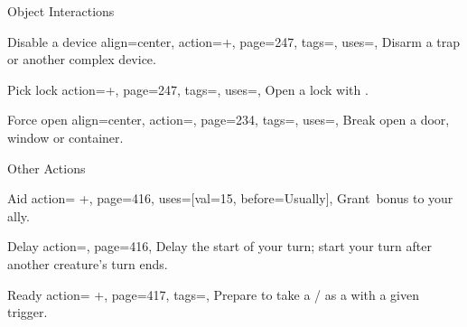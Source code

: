 \begin{PageBack}
\begin{Tables}{\backTableHeight}
\begin{Table}{Object Interactions}
\begin{entry}{Disable a device}{%
                align=center,
                action=+,
                page=247,
                tags=\Manipulate,
                uses={\Thievery[tags={T}]},
            }
                Disarm a trap or another complex device. \hfill {}\\
                \hfill
            \end{entry}
            \begin{entry}{Pick lock}{%
                action=+,
                page=247,
                tags=\Manipulate,
                uses={\Thievery[tags={T}]},
            }
                Open a lock with . \hfill{}\;
            \end{entry}
            \begin{entry}{Force open}{%
                align=center,
                action=,
                page=234,
                tags=\Attack,
                uses=\Athletics,
            }
                Break open a door, window or container. \hfill{}\\
                \hfill
            \end{entry}
        \end{Table}%
        \TableSpace
        \begin{Table}{Other Actions}
            \begin{entry}{Aid}{%
                action= +,
                page=416,
                uses={[val=15, before=Usually]},
            }
                Grant \,\Cirm bonus to your ally. \hfill
                \quad{}
            \end{entry}
            \begin{entry}{Delay}{%
                action=,
                page=416,
            }
                Delay the start of your turn; start your turn after another creature's turn ends.
            \end{entry}
            \begin{entry}{Ready}{%
                action= +,
                page=417,
                tags=\Concentrate,
            }
                Prepare to take a /\! as a  with a given trigger.
            \end{entry}

\end{Table}
\end{Tables}
\end{PageBack}
